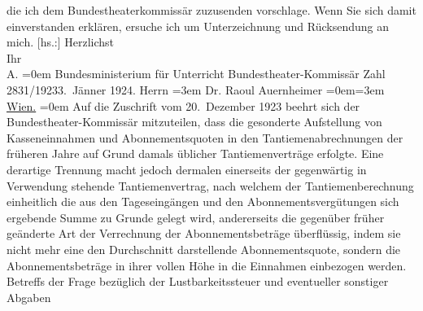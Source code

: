 {\begin{ledgroupsized}[t]{13cm}
               die ich dem Bundestheaterkommissär zuzusenden vorschlage. Wenn Sie sich damit
               einverstanden erklären, ersuche ich um Unterzeichnung und Rücksendung an mich.\pend
           \pstart
           {[}hs.:{]} Herzlichst{\\[\baselineskip]}Ihr{\\[\baselineskip]}\spacefill\mbox{A.}\pend
           \leftskip=0em{}{\bigskip}\pstart
           \noindent{}\raggedleft{}{\pb}Bundesministerium für Unterricht\pend
           \pstart
           \noindent{}\raggedleft{}Bundestheater-Kommissär\pend
           \pstart
           \noindent{}Zahl 2831/1923\hfill 3. Jänner 1924.\pend
           \pstart
           Herrn\pend
           \leftskip=3em{}\pstart
           \noindent{}Dr. Raoul Auernheimer\pend
           \leftskip=0em{}\leftskip=3em{}\pstart
           \uline{Wien.}\pend
           \leftskip=0em{}\pstart
           Auf die Zuschrift vom 20. Dezember 1923 beehrt sich der Bundestheater-Kommissär
               mitzuteilen, dass die gesonderte Aufstellung von Kasseneinnahmen und
               Abonnementsquoten in den Tantiemenabrechnungen der früheren Jahre auf Grund damals
               üblicher Tantiemenverträge erfolgte. Eine derartige Trennung macht jedoch dermalen
               einerseits der gegenwärtig in Verwendung stehende Tantiemenvertrag, nach welchem der
               Tantiemenberechnung einheitlich die aus den Tageseingängen und den
               Abonnementsvergütungen sich ergebende Summe zu Grunde gelegt wird, andererseits die
               gegenüber früher geänderte Art der Verrechnung der Abonnementsbeträge überflüssig,
                  {\pb}indem sie nicht mehr eine den Durchschnitt
               darstellende  Abonnementsquote, sondern die
               Abonnementsbeträge in ihrer vollen Höhe in die Einnahmen einbezogen werden.\pend
           \pstart
           Betreffs der Frage bezüglich der Lustbarkeitssteuer und eventueller sonstiger Abgaben

\end{ledgroupsized}}
